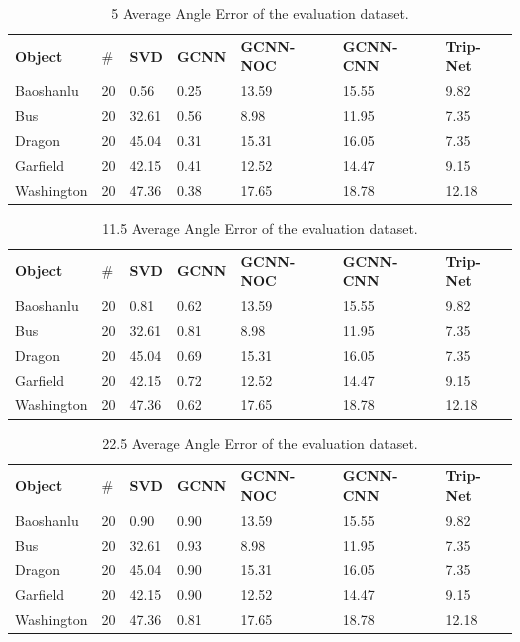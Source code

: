 \documentclass[border=15pt, multi, tikz]{article}
\newcommand{\tabhead}[1]{\textbf{#1}}
\begin{document}
\begin{table}[H]
	
	\centering
	\begin{tabular}{l l l l l l l }
		\tabhead{Object} & $ \# $ & \tabhead{SVD} & \tabhead{GCNN} & \tabhead{GCNN-NOC} & \tabhead{GCNN-CNN} & \tabhead{Trip-Net}\\
		Baoshanlu  		& 20 & 0.56  & 0.25 & 13.59 & 15.55 & 9.82\\ 
		\hline
		Bus 			& 20 & 32.61  & 0.56 & 8.98 & 11.95 & 7.35\\ 
		\hline
		Dragon 			& 20 & 45.04& 0.31 & 15.31 & 16.05 & 7.35\\
		\hline
		Garfield 		& 20 & 42.15& 0.41 & 12.52 & 14.47 & 9.15\\
		\hline
		Washington 		& 20 & 47.36 & 0.38 & 17.65 & 18.78 & 12.18\\
	\end{tabular}
	\caption{5 Average Angle Error of the evaluation dataset.}	
	\label{tab:gcnn-eval-d5}
\end{table}


\begin{table}[H]
	
	\centering
	\begin{tabular}{l l l l l l l }
		\tabhead{Object} & $ \# $ & \tabhead{SVD} & \tabhead{GCNN} & \tabhead{GCNN-NOC} & \tabhead{GCNN-CNN} & \tabhead{Trip-Net}\\
		Baoshanlu  	& 20 & 0.81 & 0.62 & 13.59 & 15.55 & 9.82\\ 
		\hline
		Bus 		& 20 & 32.61 & 0.81 & 8.98 & 11.95 & 7.35\\ 
		\hline
		Dragon 		& 20 & 45.04 & 0.69 & 15.31 & 16.05 & 7.35\\
		\hline
		Garfield 	& 20 & 42.15 & 0.72 & 12.52 & 14.47 & 9.15\\
		\hline
		Washington 	& 20 & 47.36 & 0.62 & 17.65 & 18.78 & 12.18\\
	\end{tabular}
	\caption{11.5 Average Angle Error of the evaluation dataset.}	
	\label{tab:gcnn-eval-d11}
\end{table}

\begin{table}[H]
	
	\centering
	\begin{tabular}{l l l l l l l }
		\tabhead{Object} & $ \# $ & \tabhead{SVD} & \tabhead{GCNN} & \tabhead{GCNN-NOC} & \tabhead{GCNN-CNN} & \tabhead{Trip-Net}\\
		Baoshanlu  & 20 & 0.90  &	0.90 & 13.59 & 15.55 & 9.82\\ 
		\hline
		Bus & 20 & 32.61  &			0.93 & 8.98 & 11.95 & 7.35\\ 
		\hline
		Dragon & 20 & 45.04& 		0.90 & 15.31 & 16.05 & 7.35\\
		\hline
		Garfield & 20 & 42.15& 		0.90 & 12.52 & 14.47 & 9.15\\
		\hline
		Washington & 20 & 47.36 &	0.81 & 17.65 & 18.78 & 12.18\\
	\end{tabular}
	\caption{22.5 Average Angle Error of the evaluation dataset.}	
	\label{tab:gcnn-eval-d22}
\end{table}
\end{document}
